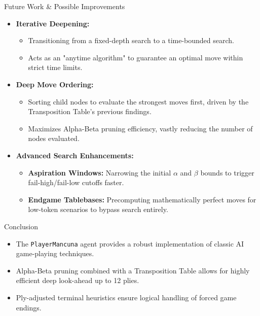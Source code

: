 \documentclass{beamer}
\begin{document}
\begin{frame}{Future Work \& Possible Improvements}
    \begin{itemize}
        \item \textbf{Iterative Deepening:}
        \begin{itemize}
            \item Transitioning from a fixed-depth search to a time-bounded search.
            \item Acts as an "anytime algorithm" to guarantee an optimal move within strict time limits.
        \end{itemize}
        \item \textbf{Deep Move Ordering:}
        \begin{itemize}
            \item Sorting child nodes to evaluate the strongest moves first, driven by the Transposition Table's previous findings.
            \item Maximizes Alpha-Beta pruning efficiency, vastly reducing the number of nodes evaluated.
        \end{itemize}
        \item \textbf{Advanced Search Enhancements:}
        \begin{itemize}
            \item \textbf{Aspiration Windows:} Narrowing the initial $\alpha$ and $\beta$ bounds to trigger fail-high/fail-low cutoffs faster.
            \item \textbf{Endgame Tablebases:} Precomputing mathematically perfect moves for low-token scenarios to bypass search entirely.
        \end{itemize}
    \end{itemize}
\end{frame}

\begin{frame}{Conclusion}
    \begin{itemize}
        \item The \texttt{PlayerMancuna} agent provides a robust implementation of classic AI game-playing techniques.
        \item Alpha-Beta pruning combined with a Transposition Table allows for highly efficient deep look-ahead up to 12 plies.
        \item Ply-adjusted terminal heuristics ensure logical handling of forced game endings.
    \end{itemize}
    \vfill
    \centering
    
\end{frame}
\end{document}
